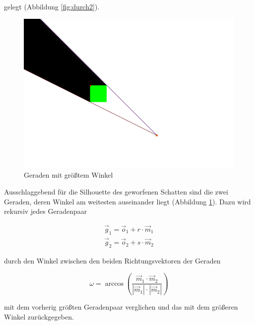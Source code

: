 gelegt (Abbildung \ref{fig:durch2}).

\begin{figure}[t]
	\centering
	\includegraphics[width=\columnwidth]{images/durchfuehrung_4.png}
	\caption{Geraden mit größtem Winkel}
	\label{fig:durch3}
\end{figure}


Ausschlaggebend für die Silhouette des geworfenen Schatten sind die zwei Geraden, deren Winkel am
weitesten auseinander liegt (Abbildung \ref{fig:durch3}). Dazu wird rekursiv jedes Geradenpaar

\begin{equation}
  \begin{split}
	\vec{g}_1 = \vec{o}_1 + r \cdot \vec{m}_1 \\
	\vec{g}_2 = \vec{o}_2 + s \cdot \vec{m}_2
  \end{split}
\end{equation}

durch den Winkel zwischen den beiden Richtungsvektoren der Geraden

\begin{equation}
	\omega = \arccos{\left(\frac{\vec{m}_1 \cdot \vec{m}_2}{|\vec{m}_1| \cdot |\vec{m}_2|} \right)}
\end{equation}

mit dem vorherig größten Geradenpaar verglichen und das mit dem größeren Winkel zurückgegeben.

